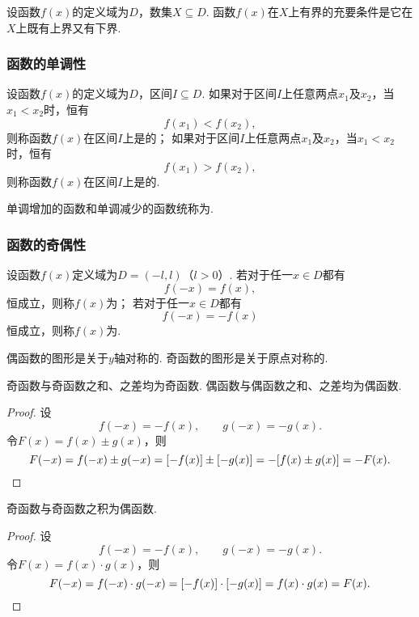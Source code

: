 \begin{theorem}
设函数\(f(x)\)的定义域为\(D\)，数集\(X \subseteq D\).
函数\(f(x)\)在\(X\)上有界的充要条件是它在\(X\)上既有上界又有下界.
\end{theorem}

\subsubsection{函数的单调性}
\begin{definition}
设函数\(f(x)\)的定义域为\(D\)，区间\(I \subseteq D\).
如果对于区间\(I\)上任意两点\(x_1\)及\(x_2\)，当\(x_1 < x_2\)时，恒有\[
f(x_1) < f(x_2),
\]则称函数\(f(x)\)在区间\(I\)上是的；
如果对于区间\(I\)上任意两点\(x_1\)及\(x_2\)，当\(x_1 < x_2\)时，恒有\[
f(x_1) > f(x_2),
\]则称函数\(f(x)\)在区间\(I\)上是的.

单调增加的函数和单调减少的函数统称为.
\end{definition}

\subsubsection{函数的奇偶性}
\begin{definition}
设函数\(f(x)\)定义域为\(D=(-l,l)\)（\(l>0\)）.
若对于任一\(x \in D\)都有\[
f(-x) = f(x),
\]恒成立，则称\(f(x)\)为；
若对于任一\(x \in D\)都有\[
f(-x) = -f(x)
\]恒成立，则称\(f(x)\)为.
\end{definition}

\begin{property}
偶函数的图形是关于\(y\)轴对称的.
奇函数的图形是关于原点对称的.
\end{property}

\begin{property}
奇函数与奇函数之和、之差均为奇函数.
偶函数与偶函数之和、之差均为偶函数.
\begin{proof}
设\[
f(-x) = -f(x), \qquad g(-x) = -g(x).
\]令\(F(x) = f(x) \pm g(x)\)，则\[
F(-x) = f(-x) \pm g(-x)
= [-f(x)] \pm [-g(x)]
= -[f(x) \pm g(x)]
= -F(x).
\qedhere
\]
\end{proof}
\end{property}

\begin{property}
奇函数与奇函数之积为偶函数.
\begin{proof}
设\[
f(-x) = -f(x), \qquad g(-x) = -g(x).
\]令\(F(x) = f(x) \cdot g(x)\)，则\[
F(-x) = f(-x) \cdot g(-x)
= [-f(x)] \cdot [-g(x)]
= f(x) \cdot g(x)
= F(x).
\qedhere
\]
\end{proof}
\end{property}

